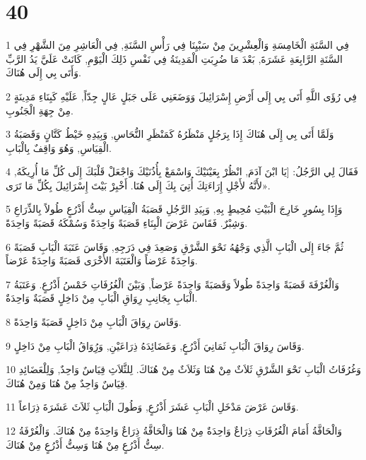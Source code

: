 \chapter{40}

\par 1 فِي السَّنَةِ الْخَامِسَةِ وَالْعِشْرِينَ مِنْ سَبْيِنَا فِي رَأْسِ السَّنَةِ, فِي الْعَاشِرِ مِنَ الشَّهْرِ فِي السَّنَةِ الرَّابِعَةِ عَشَرَةَ, بَعْدَ مَا ضُرِبَتِ الْمَدِينَةُ فِي نَفْسِ ذَلِكَ الْيَوْمِ, كَانَتْ عَلَيَّ يَدُ الرَّبِّ وَأَتَى بِي إِلَى هُنَاكَ.
\par 2 فِي رُؤَى اللَّهِ أَتَى بِي إِلَى أَرْضِ إِسْرَائِيلَ وَوَضَعَنِي عَلَى جَبَلٍ عَالٍ جِدّاً, عَلَيْهِ كَبِنَاءِ مَدِينَةٍ مِنْ جِهَةِ الْجَنُوبِ.
\par 3 وَلَمَّا أَتَى بِي إِلَى هُنَاكَ إِذَا بِرَجُلٍ مَنْظَرُهُ كَمَنْظَرِ النُّحَاسِ, وَبِيَدِهِ خَيْطُ كَتَّانٍ وَقَصَبَةُ الْقِيَاسِ, وَهُوَ وَاقِفٌ بِالْبَابِ.
\par 4 فَقَالَ لِي الرَّجُلُ: [يَا ابْنَ آدَمَ, انْظُرْ بِعَيْنَيْكَ وَاسْمَعْ بِأُذُنَيْكَ وَاجْعَلْ قَلْبَكَ إِلَى كُلِّ مَا أُرِيكَهُ, لأَنَّهُ لأَجْلِ إِرَاءَتِكَ أُتِيَ بِكَ إِلَى هُنَا. أَخْبِرْ بَيْتَ إِسْرَائِيلَ بِكُلِّ مَا تَرَى».
\par 5 وَإِذَا بِسُورٍ خَارِجَ الْبَيْتِ مُحِيطٍ بِهِ, وَبِيَدِ الرَّجُلِ قَصَبَةُ الْقِيَاسِ سِتُّ أَذْرُعٍ طُولاً بِالذِّرَاعِ وَشِبْرٌ. فَقَاسَ عَرْضَ الْبِنَاءِ قَصَبَةً وَاحِدَةً وَسُمْكَهُ قَصَبَةً وَاحِدَةً.
\par 6 ثُمَّ جَاءَ إِلَى الْبَابِ الَّذِي وَجْهُهُ نَحْوَ الشَّرْقِ وَصَعِدَ فِي دَرَجِهِ, وَقَاسَ عَتَبَةَ الْبَابِ قَصَبَةً وَاحِدَةً عَرْضاً وَالْعَتَبَةَ الأُخْرَى قَصَبَةً وَاحِدَةً عَرْضاً.
\par 7 وَالْغُرْفَةَ قَصَبَةً وَاحِدَةً طُولاً وَقَصَبَةً وَاحِدَةً عَرْضاً, وَبَيْنَ الْغُرُفَاتِ خَمْسُ أَذْرُعٍ. وَعَتَبَةُ الْبَابِ بِجَانِبِ رِوَاقِ الْبَابِ مِنْ دَاخِلٍ قَصَبَةٌ وَاحِدَةٌ.
\par 8 وَقَاسَ رِوَاقَ الْبَابِ مِنْ دَاخِلٍ قَصَبَةً وَاحِدَةً.
\par 9 وَقَاسَ رِوَاقَ الْبَابِ ثَمَانِيَ أَذْرُعٍ, وَعَضَائِدَهُ ذِرَاعَيْنِ, وَرُِوَاقُ الْبَابِ مِنْ دَاخِلٍ.
\par 10 وَغُرُفَاتُ الْبَابِ نَحْوَ الشَّرْقِ ثَلاَثٌ مِنْ هُنَا وَثَلاَثٌ مِنْ هُنَاكَ. لِلثَّلاَثِ قِيَاسٌ وَاحِدٌ, وَلِلْعَضَائِدِ قِيَاسٌ وَاحِدٌ مِنْ هُنَا وَمِنْ هُنَاكَ.
\par 11 وَقَاسَ عَرْضَ مَدْخَلِ الْبَابِ عَشَرَ أَذْرُعٍ, وَطُولَ الْبَابِ ثَلاَثَ عَشَرَةَ ذِرَاعاً.
\par 12 وَالْحَافَّةُ أَمَامَ الْغُرُفَاتِ ذِرَاعٌ وَاحِدَةٌ مِنْ هُنَا وَالْحَافَّةُ ذِرَاعٌ وَاحِدَةٌ مِنْ هُنَاكَ. وَالْغُرْفَةُ سِتُّ أَذْرُعٍ مِنْ هُنَا وَسِتُّ أَذْرُعٍ مِنْ هُنَاكَ.
